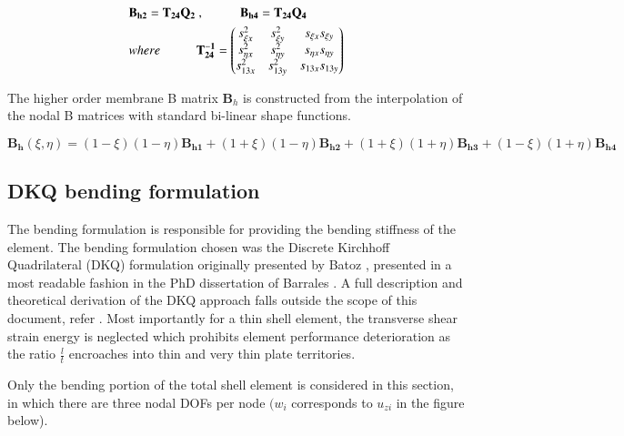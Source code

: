 \begin{gather} 
	\begin{aligned}
		&\mathbf{B_{h2}} = \mathbf{T_{24}}  \mathbf{Q_{2}}\ ,
		\hspace{10mm}
		\mathbf{B_{h4}} = \mathbf{T_{24}}  \mathbf{Q_{4}}\\
		&where 
		\hspace{10mm} 
		\mathbf{T_{24}^{-1}} =
		\begin{pmatrix}
			s_{\xi x}^2 & s_{\xi y}^2 & s_{\xi x} s_{\xi y} \\
			s_{\eta x}^2 & s_{\eta y}^2 & s_{\eta x} s_{\eta y} \\
			s_{13 x}^2 & s_{13 y}^2 & s_{13 x} s_{13 y}
		\end{pmatrix}
		\label{equation18}
	\end{aligned}
\end{gather}

The higher order membrane B matrix $\mathbf{B}_h$ is constructed from the interpolation of the nodal B matrices with standard bi-linear shape functions.

\begin{equation} 
\mathbf{B_h}(\xi,\eta) = (1-\xi)(1-\eta)\mathbf{B_{h1}} + (1+\xi)(1-\eta)\mathbf{B_{h2}} + (1+\xi)(1+\eta)\mathbf{B_{h3}} +	(1-\xi)(1+\eta)\mathbf{B_{h4}} 
\label{equation19}
\end{equation}


\subsection{DKQ bending formulation}

The bending formulation is responsible for providing the bending stiffness of the element. The bending formulation chosen was the Discrete Kirchhoff Quadrilateral (DKQ) formulation  originally presented by Batoz \cite{Bat82}, presented in a most readable fashion in the PhD dissertation of Barrales \cite{Bar12}. A full description and theoretical derivation of the DKQ approach falls outside the scope of this document, refer \cite{Bat82}. Most importantly for a thin shell element, the transverse shear strain energy is neglected which prohibits element performance deterioration as the ratio $\frac{l}{t}$ encroaches into thin and very thin plate territories.

Only the bending portion of the total shell element is considered in this section, in which there are three nodal DOFs per node $(w_i$ corresponds to $u_{zi}$ in the figure below).


